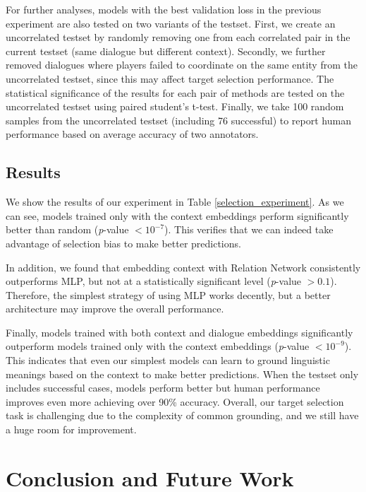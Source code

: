 \documentclass[letterpaper]{article} %
\begin{document}
For further analyses, models with the best validation loss in the previous experiment are also tested on two variants of the testset. First, we create an uncorrelated testset by randomly removing one from each correlated pair in the current testset (same dialogue but different context). Secondly, we further removed dialogues where players failed to coordinate on the same entity from the uncorrelated testset, since this may affect target selection performance. The statistical significance of the results for each pair of methods are tested on the uncorrelated testset using paired student's t-test. Finally, we take 100 random samples from the uncorrelated testset (including 76 successful) to report human performance based on average accuracy of two annotators.

\subsection{Results}

We show the results of our experiment in Table \ref{selection_experiment}. As we can see, models trained only with the context embeddings perform significantly better than random (\textit{p}-value $<10^{-7}$). This verifies that we can indeed take advantage of selection bias to make better predictions.

In addition, we found that embedding context with Relation Network consistently outperforms MLP, but not at a statistically significant level (\textit{p}-value $>0.1$). Therefore, the simplest strategy of using MLP works decently, but a better architecture may improve the overall performance.

Finally, models trained with both context and dialogue embeddings significantly outperform models trained only with the context embeddings (\textit{p}-value $<10^{-9}$). This indicates that even our simplest models can learn to ground linguistic meanings based on the context to make better predictions. When the testset only includes successful cases, models perform better but human performance improves even more achieving over 90\% accuracy. Overall, our target selection task is challenging due to the complexity of common grounding, and we still have a huge room for improvement.

\section{Conclusion and Future Work}
\label{section:conclusion}
\end{document}
